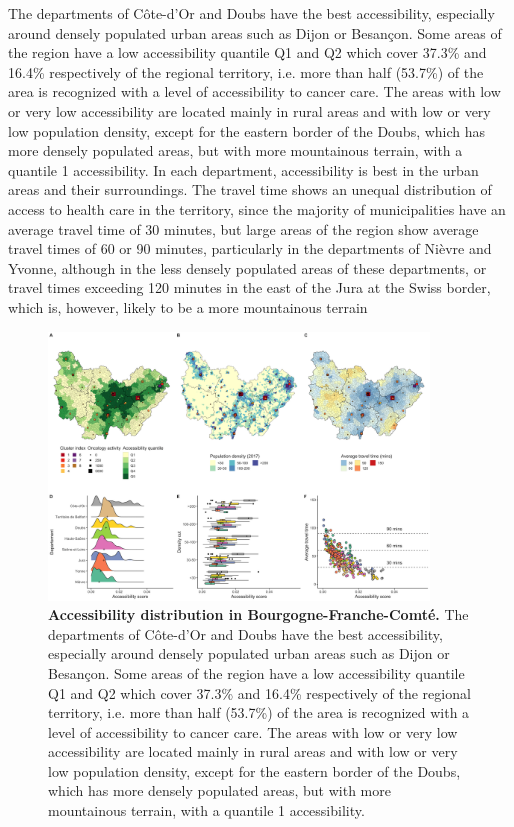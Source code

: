 The departments of Côte-d'Or and Doubs have the best accessibility, especially
around densely populated urban areas such as Dijon or Besançon. Some areas of
the region have a low accessibility quantile Q1 and Q2 which cover 37.3\% and
16.4\% respectively of the regional territory, i.e. more than half (53.7\%) of
the area is recognized with a level of accessibility to cancer care. The areas
with low or very low accessibility are located mainly in rural areas and with
low or very low population density, except for the eastern border of the Doubs,
which has more densely populated areas, but with more mountainous terrain, with
a quantile 1 accessibility. In each department, accessibility is best in the
urban areas and their surroundings. The travel time shows an unequal
distribution of access to health care in the territory, since the majority of
municipalities have an average travel time of 30 minutes, but large areas of the
region show average travel times of 60 or 90 minutes, particularly in the
departments of Nièvre and Yvonne, although in the less densely populated areas
of these departments, or travel times exceeding 120 minutes in the east of the
Jura at the Swiss border, which is, however, likely to be a more mountainous
terrain

\begin{figure}[H]
    \includegraphics[width=0.9\textwidth]{images/camion/region_accessibility/accessibility_Bourgogne-Franche-Comte.png}
    \centering
    \caption{ \textbf{Accessibility distribution in Bourgogne-Franche-Comté.}
        The departments of Côte-d'Or and Doubs have the best accessibility,
        especially around densely populated urban areas such as Dijon or
        Besançon. Some areas of the region have a low accessibility quantile Q1
        and Q2 which cover 37.3\% and 16.4\% respectively of the regional
        territory, i.e. more than half (53.7\%) of the area is recognized with a
        level of accessibility to cancer care. The areas with low or very low
        accessibility are located mainly in rural areas and with low or very low
        population density, except for the eastern border of the Doubs, which
        has more densely populated areas, but with more mountainous terrain,
        with a quantile 1 accessibility. }
\end{figure}

